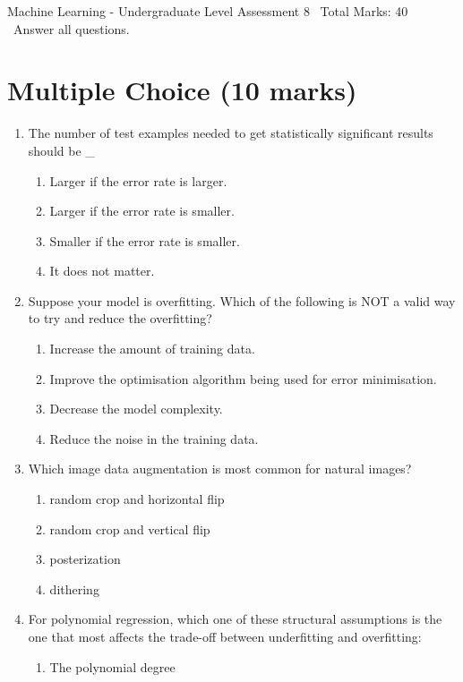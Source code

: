 \documentclass[12pt]{article}
\begin{document}
\begin{center}
Machine Learning - Undergraduate Level Assessment 8 \
Total Marks: 40 \
Answer all questions.
\end{center}

\section*{Multiple Choice (10 marks)}
\begin{enumerate}[label=\arabic*.]
\item The number of test examples needed to get statistically significant results should be \_
\begin{enumerate}[label=(\alph*)]
    \item Larger if the error rate is larger.
    \item Larger if the error rate is smaller.
    \item Smaller if the error rate is smaller.
    \item It does not matter.
\end{enumerate}
\item Suppose your model is overfitting. Which of the following is NOT a valid way to try and reduce the overfitting?
\begin{enumerate}[label=(\alph*)]
    \item Increase the amount of training data.
    \item Improve the optimisation algorithm being used for error minimisation.
    \item Decrease the model complexity.
    \item Reduce the noise in the training data.
\end{enumerate}
\item Which image data augmentation is most common for natural images?
\begin{enumerate}[label=(\alph*)]
    \item random crop and horizontal flip
    \item random crop and vertical flip
    \item posterization
    \item dithering
\end{enumerate}
\item For polynomial regression, which one of these structural assumptions is the one that most affects the trade-off between underfitting and overfitting:
\begin{enumerate}[label=(\alph*)]
    \item The polynomial degree

\end{enumerate}
\end{enumerate}
\end{document}
